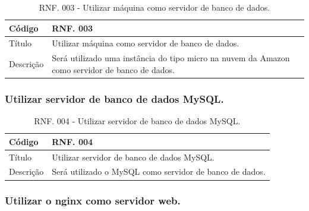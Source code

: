 \documentclass[11pt]{article}
\begin{document}
        \begin{table}[h]
          \begin{center}
            \begin{tabular}{ | p{5cm} | p{10cm} | }
              \hline
              Código\cellcolor{gray} & RNF. 003\cellcolor{gray} \\
              \hline
              Título & Utilizar máquina como servidor de banco de dados. \\
              \hline
              Descrição & Será utilizado uma instância do tipo micro na nuvem da Amazon como servidor de banco de dados. \\
              \hline
            \end{tabular}
            \caption{RNF. 003 - Utilizar máquina como servidor de banco de dados.}
          \end{center}
        \end{table}

    \clearpage

      \subsubsection{Utilizar servidor de banco de dados MySQL.}

        \begin{table}[h]
          \begin{center}
            \begin{tabular}{ | p{5cm} | p{10cm} | }
              \hline
              Código\cellcolor{gray} & RNF. 004\cellcolor{gray} \\
              \hline
              Título & Utilizar servidor de banco de dados MySQL. \\
              \hline
              Descrição & Será utilizado o MySQL como servidor de banco de dados. \\
              \hline
            \end{tabular}
            \caption{RNF. 004 - Utilizar servidor de banco de dados MySQL.}
          \end{center}
        \end{table}

      \subsubsection{Utilizar o nginx como servidor web.}
\end{document}
